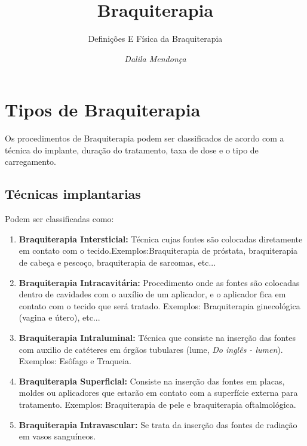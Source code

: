 \documentclass[11pt,a4paper]{article}
\title{Braquiterapia}
\author{Definições E Física da Braquiterapia\nocite{*}}
\date{\textit{Dalila Mendonça}}
\begin{document}
	\maketitle



	\section{Tipos de Braquiterapia}

	Os procedimentos de Braquiterapia podem ser classificados de acordo com a técnica do implante, duração do tratamento, taxa de dose e o tipo de carregamento.

		\subsection{Técnicas implantarias}

		Podem ser classificadas como:

		\begin{enumerate}
			\item \textbf{Braquiterapia Intersticial:} Técnica cujas fontes são colocadas diretamente em contato com o tecido.Exemplos:Braquiterapia de próstata, braquiterapia de cabeça e pescoço, braquiterapia de sarcomas, etc...
			
			\item \textbf{Braquiterapia Intracavitária:}  Procedimento onde as fontes são colocadas dentro de cavidades com o auxílio de um aplicador, e o aplicador fica em contato com o tecido que será tratado. Exemplos: Braquiterapia ginecológica (vagina e útero), etc...
			
			
			\item \textbf{Braquiterapia Intraluminal:} Técnica que consiste na inserção das fontes com auxilio de catéteres em órgãos tubulares (lume, \textit{Do inglês - lumen}). Exemplos: Esôfago e Traqueia.
			
			\item \textbf{Braquiterapia Superficial:} Consiste na inserção das fontes em placas, moldes ou aplicadores que estarão em contato com a superfície externa para tratamento. Exemplos: Braquiterapia de pele e braquiterapia oftalmológica.
			
			\item \textbf{Braquiterapia Intravascular:} Se trata da inserção das fontes de radiação em vasos sanguíneos.

		\end{enumerate}
\end{document}
